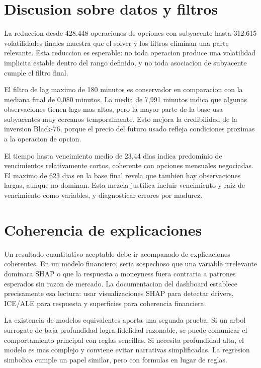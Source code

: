 \section{Discusion sobre datos y filtros}

La reduccion desde 428.448 operaciones de opciones con subyacente hasta 312.615 volatilidades finales muestra que el solver y los filtros eliminan una parte relevante. Esta reduccion es esperable: no toda operacion produce una volatilidad implicita estable dentro del rango definido, y no toda asociacion de subyacente cumple el filtro final.

El filtro de lag maximo de 180 minutos es conservador en comparacion con la mediana final de 0,080 minutos. La media de 7,991 minutos indica que algunas observaciones tienen lags mas altos, pero la mayor parte de la base usa subyacentes muy cercanos temporalmente. Esto mejora la credibilidad de la inversion Black-76, porque el precio del futuro usado refleja condiciones proximas a la operacion de opcion.

El tiempo hasta vencimiento medio de 23,44 dias indica predominio de vencimientos relativamente cortos, coherente con opciones mensuales negociadas. El maximo de 623 dias en la base final revela que tambien hay observaciones largas, aunque no dominan. Esta mezcla justifica incluir vencimiento y raiz de vencimiento como variables, y diagnosticar errores por madurez.

\section{Coherencia de explicaciones}

Un resultado cuantitativo aceptable debe ir acompanado de explicaciones coherentes. En un modelo financiero, seria sospechoso que una variable irrelevante dominara SHAP o que la respuesta a moneyness fuera contraria a patrones esperados sin razon de mercado. La documentacion del dashboard establece precisamente esa lectura: usar visualizaciones SHAP para detectar drivers, ICE/ALE para respuesta y superficies para coherencia financiera.

La existencia de modelos equivalentes aporta una segunda prueba. Si un arbol surrogate de baja profundidad logra fidelidad razonable, se puede comunicar el comportamiento principal con reglas sencillas. Si necesita profundidad alta, el modelo es mas complejo y conviene evitar narrativas simplificadas. La regresion simbolica cumple un papel similar, pero con formulas en lugar de reglas.

